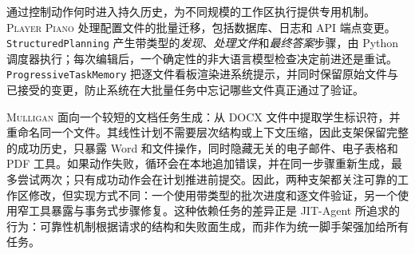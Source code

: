 \documentclass{article}
\newcommand{\ourmethod}{JIT-Agent\xspace}
\begin{document}
 通过控制动作何时进入持久历史，为不同规模的工作区执行提供专用机制。\textsc{Player Piano} 处理配置文件的批量迁移，包括数据库、日志和 API 端点变更。\texttt{StructuredPlanning} 产生带类型的\textit{发现}、\textit{处理文件}和\textit{最终答案}步骤，由 Python 调度器执行；每次编辑后，一个确定性的非大语言模型检查决定前进还是重试。\texttt{ProgressiveTaskMemory} 把逐文件看板渲染进系统提示，并同时保留原始文件与已接受的变更，防止系统在大批量任务中忘记哪些文件真正通过了验证。

\textsc{Mulligan} 面向一个较短的文档任务生成：从 DOCX 文件中提取学生标识符，并重命名同一个文件。其线性计划不需要层次结构或上下文压缩，因此支架保留完整的成功历史，只暴露 Word 和文件操作，同时隐藏无关的电子邮件、电子表格和 PDF 工具。如果动作失败，循环会在本地追加错误，并在同一步骤重新生成，最多尝试两次；只有成功动作会在计划推进前提交。因此，两种支架都关注可靠的工作区修改，但实现方式不同：一个使用带类型的批次进度和逐文件验证，另一个使用窄工具暴露与事务式步骤修复。这种依赖任务的差异正是 \ourmethod 所追求的行为：可靠性机制根据请求的结构和失败面生成，而非作为统一脚手架强加给所有任务。
\end{document}
